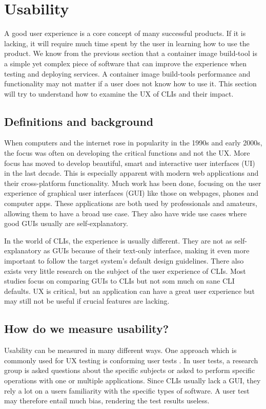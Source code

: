 \section{Usability} %
A good user experience is a core concept of many successful products. If it is lacking, it will require much time spent by the user in learning how to use the product. We know from the previous section that a container image build-tool is a simple yet complex piece of software that can improve the experience when testing and deploying services. A container image build-tools performance and functionality may not matter if a user does not know how to use it. This section will try to understand how to examine the UX of CLIs and their impact. 
\subsection{Definitions and background}
When computers and the internet rose in popularity in the 1990s and early 2000s, the focus was often on developing the critical functions and not the UX. More focus has moved to develop beautiful, smart and interactive user interfaces (UI) in the last decade. This is especially apparent with modern web applications and their cross-platform functionality. Much work has been done, focusing on the user experience of graphical user interfaces (GUI) like those on webpages, phones and computer apps. These applications are both used by professionals and amateurs, allowing them to have a broad use case. They also have wide use cases where good GUIs usually are self-explanatory. 

In the world of CLIs, the experience is usually different. They are not as self-explanatory as GUIs because of their text-only interface, making it even more important to follow the target system's default design guidelines. There also exists very little research on the subject of the user experience of CLIs. Most studies focus on comparing GUIs to CLIs but not som much on sane CLI defaults. UX is critical, but an application can have a great user experience but may still not be useful if crucial features are lacking.
\subsection{How do we measure usability?}
Usability can be measured in many different ways. One approach which is commonly used for UX testing is conforming user tests \cite{user_tests}. In user tests, a research group is asked questions about the specific subjects or asked to perform specific operations with one or multiple applications. Since CLIs usually lack a GUI, they rely a lot on a users familiarity with the specific types of software. A user test may therefore entail much bias, rendering the test results useless. 

